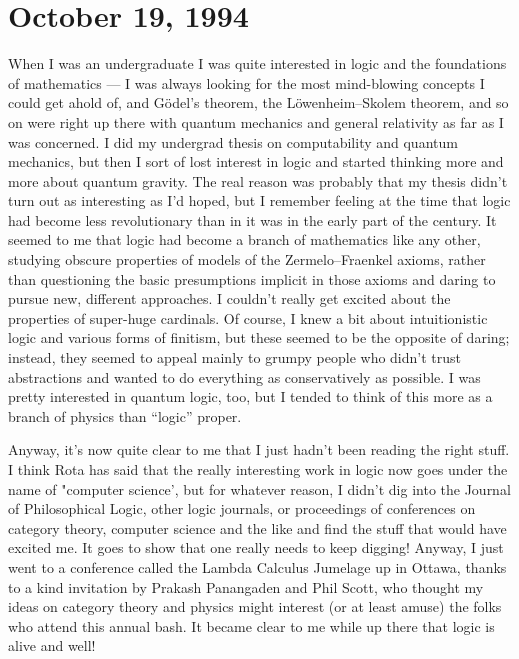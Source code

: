 \documentclass[12pt]{article}
\begin{document}
\hypertarget{week40}{%
\section{October 19, 1994}\label{week40}}

When I was an undergraduate I was quite interested in logic and the
foundations of mathematics --- I was always looking for the most
mind-blowing concepts I could get ahold of, and G\"odel's theorem, the
L\"owenheim--Skolem theorem, and so on were right up there with quantum
mechanics and general relativity as far as I was concerned. I did my
undergrad thesis on computability and quantum mechanics, but then I sort
of lost interest in logic and started thinking more and more about
quantum gravity. The real reason was probably that my thesis didn't turn
out as interesting as I'd hoped, but I remember feeling at the time that
logic had become less revolutionary than in it was in the early part of
the century. It seemed to me that logic had become a branch of
mathematics like any other, studying obscure properties of models of the
Zermelo--Fraenkel axioms, rather than questioning the basic presumptions
implicit in those axioms and daring to pursue new, different approaches.
I couldn't really get excited about the properties of super-huge
cardinals. Of course, I knew a bit about intuitionistic logic and
various forms of finitism, but these seemed to be the opposite of
daring; instead, they seemed to appeal mainly to grumpy people who
didn't trust abstractions and wanted to do everything as conservatively
as possible. I was pretty interested in quantum logic, too, but I tended
to think of this more as a branch of physics than ``logic'' proper.

Anyway, it's now quite clear to me that I just hadn't been reading the
right stuff. I think Rota has said that the really interesting work in
logic now goes under the name of "computer science', but for whatever
reason, I didn't dig into the Journal of Philosophical Logic, other
logic journals, or proceedings of conferences on category theory,
computer science and the like and find the stuff that would have excited
me. It goes to show that one really needs to keep digging! Anyway, I
just went to a conference called the Lambda Calculus Jumelage up in
Ottawa, thanks to a kind invitation by Prakash Panangaden and Phil
Scott, who thought my ideas on category theory and physics might
interest (or at least amuse) the folks who attend this annual bash. It
became clear to me while up there that logic is alive and well!
\end{document}
